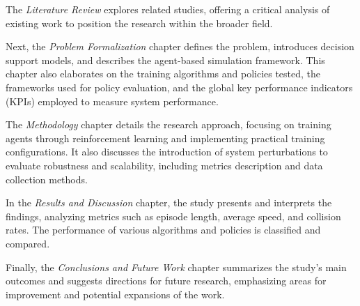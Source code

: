 The \textit{Literature Review} explores related studies, offering a critical analysis of existing work to position the research within the broader field. 

Next, the \textit{Problem Formalization} chapter defines the problem, introduces decision support models, and describes the agent-based simulation 
framework. 
This chapter also elaborates on the training algorithms and policies tested, the frameworks used for policy evaluation, 
and the global key performance indicators (KPIs) employed to measure system performance.

The \textit{Methodology} chapter details the research approach, focusing on training agents through reinforcement learning and implementing practical 
training configurations. 
It also discusses the introduction of system perturbations to evaluate robustness and scalability, including metrics description and data collection 
methods.

In the \textit{Results and Discussion} chapter, the study presents and interprets the findings, analyzing metrics such as episode length, average speed, 
and collision rates. The performance of various algorithms and policies is classified and compared.

Finally, the \textit{Conclusions and Future Work} chapter summarizes the study's main outcomes and suggests directions for future research, 
emphasizing areas for improvement and potential expansions of the work.
